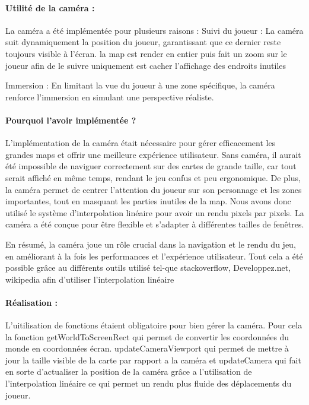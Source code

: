 \documentclass[12pt,a4paper, twoside]{article}
\begin{document}
    \paragraph{Utilité de la caméra :} La caméra a été implémentée pour plusieurs raisons :
    Suivi du joueur : La caméra suit dynamiquement la position du joueur, garantissant que ce dernier reste toujours visible à l'écran.
    la map est render en entier puis fait un zoom sur le joueur afin de le suivre uniquement est cacher l'affichage des endroits inutiles

    Immersion : En limitant la vue du joueur à une zone spécifique, la caméra renforce l'immersion en simulant une perspective réaliste.

    \paragraph{Pourquoi l'avoir implémentée ?}

    L'implémentation de la caméra était nécessaire pour gérer efficacement les grandes maps et offrir une meilleure expérience utilisateur. Sans caméra, il aurait été impossible de naviguer correctement sur des cartes de grande taille, car tout serait affiché en même temps, rendant le jeu confus et peu ergonomique. De plus, la caméra permet de centrer l'attention du joueur sur son personnage et les zones importantes, tout en masquant les parties inutiles de la map.
    Nous avons donc utilisé le système d'interpolation linéaire pour avoir un rendu pixels par pixels.
    La caméra a été conçue pour être flexible et s'adapter à différentes tailles de fenêtres.

    En résumé, la caméra joue un rôle crucial dans la navigation et le rendu du jeu, en améliorant à la fois les performances et l'expérience utilisateur.
    Tout cela a été possible grâce au différents outils utilisé tel-que stackoverflow, Developpez.net, wikipedia afin d'utiliser l'interpolation linéaire
    \paragraph{Réalisation : }
    L'uitilisation de fonctions étaient obligatoire pour bien gérer la caméra. Pour cela la fonction getWorldToScreenRect qui permet de convertir les coordonnées du monde en coordonnées écran.
    updateCameraViewport qui permet de mettre à jour la taille visible de la carte par rapport a la caméra et updateCamera qui fait en sorte d'actualiser la position de la caméra grâce a l'utilisation de l'interpolation linéaire
    ce qui permet un rendu plus fluide des déplacements du joueur.
\end{document}
